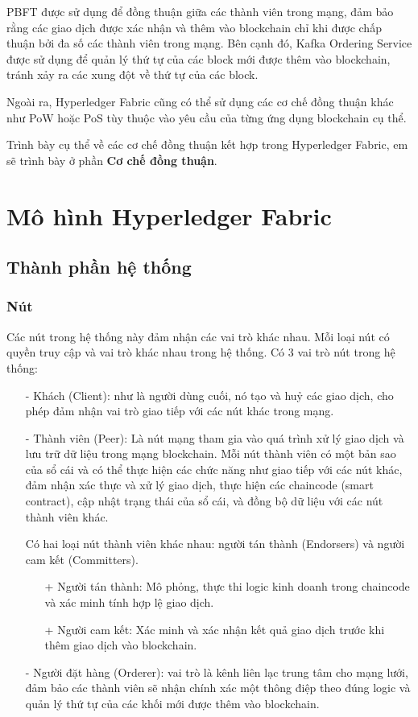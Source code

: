 PBFT được sử dụng để đồng thuận giữa các thành viên trong mạng, đảm bảo rằng các giao dịch 
được xác nhận và thêm vào blockchain chỉ khi được chấp thuận bởi đa số các thành viên trong mạng. 
Bên cạnh đó, Kafka Ordering Service được sử dụng để quản lý thứ tự của các block mới được 
thêm vào blockchain, tránh xảy ra các xung đột về thứ tự của các block. 

Ngoài ra, Hyperledger Fabric cũng có thể sử dụng các cơ chế đồng thuận khác như PoW hoặc PoS 
tùy thuộc vào yêu cầu của từng ứng dụng blockchain cụ thể. 

Trình bày cụ thể về các cơ chế đồng thuận kết hợp trong Hyperledger Fabric, em sẽ trình bày 
ở phần \textbf{Cơ chế đồng thuận}.
\section{Mô hình Hyperledger Fabric}
\subsection{Thành phần hệ thống}
\subsubsection{Nút}
Các nút trong hệ thống này đảm nhận các vai trò khác nhau. Mỗi loại nút có quyền truy cập và vai trò khác
nhau trong hệ thống.
Có 3 vai trò nút trong hệ thống:  
\begin{itemize}
    \item[-] Khách (Client): như là người dùng cuối, nó tạo và huỷ 
    các giao dịch, cho phép đảm nhận vai trò giao tiếp với các nút khác trong mạng.
    \item[-] Thành viên (Peer): Là nút mạng tham gia vào quá trình xử lý giao dịch và lưu trữ 
    dữ liệu trong mạng blockchain. Mỗi nút thành viên có một bản sao của sổ cái và có 
    thể thực hiện các chức năng như giao tiếp với các nút khác, đảm nhận xác thực và xử lý 
    giao dịch, thực hiện các chaincode (smart contract), cập nhật trạng thái của 
    sổ cái, và đồng bộ dữ liệu với các nút thành viên khác.
    
    Có hai loại nút thành viên khác nhau: người tán thành (Endorsers) và người cam kết (Committers).
        \begin{itemize}
            \item[+] Người tán thành: Mô phỏng, thực thi logic kinh doanh trong chaincode và xác minh tính hợp lệ giao dịch.
            \item[+] Người cam kết: Xác minh và xác nhận kết quả giao dịch trước khi thêm giao dịch vào blockchain. \cite{hyperledger1}
        \end{itemize}
    \item[-] Người đặt hàng (Orderer): vai trò là kênh liên lạc trung tâm cho mạng lưới, 
    đảm bảo các thành viên sẽ nhận chính 
    xác một thông điệp theo đúng logic và quản lý thứ tự của các 
    khối mới được thêm vào blockchain.
    
\end{itemize}
